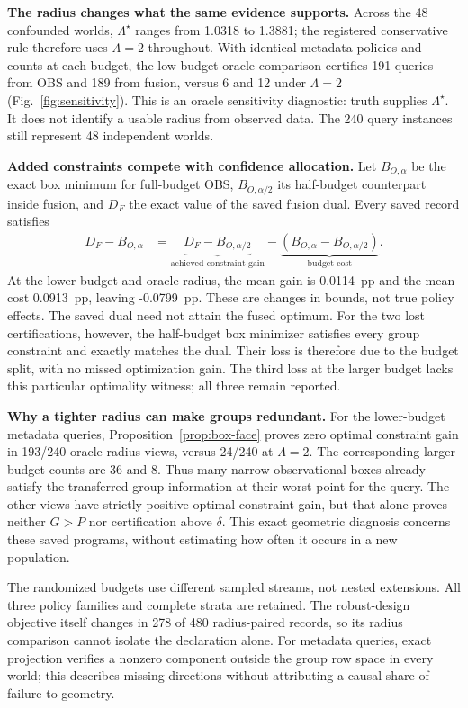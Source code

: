 \textbf{The radius changes what the same evidence supports.}
Across the 48 confounded worlds, $\Lambda^\star$ ranges from 1.0318 to 1.3881; the registered conservative rule therefore uses $\Lambda=2$ throughout. With identical metadata policies and counts at each budget, the low-budget oracle comparison certifies 191 queries from OBS and 189 from fusion, versus 6 and 12 under $\Lambda=2$ (Fig.~\ref{fig:sensitivity}). This is an oracle sensitivity diagnostic: truth supplies $\Lambda^\star$. It does not identify a usable radius from observed data. The 240 query instances still represent 48 independent worlds.

\textbf{Added constraints compete with confidence allocation.}
Let $B_{O,\alpha}$ be the exact box minimum for full-budget OBS, $B_{O,\alpha/2}$ its half-budget counterpart inside fusion, and $D_F$ the exact value of the saved fusion dual. Every saved record satisfies
\begin{align}
 D_F-B_{O,\alpha}
 &=\underbrace{D_F-B_{O,\alpha/2}}_{\text{achieved constraint gain}}
 -\underbrace{(B_{O,\alpha}-B_{O,\alpha/2})}_{\text{budget cost}}.\label{eq:budget-diagnostic}
\end{align}
At the lower budget and oracle radius, the mean gain is 0.0114~pp and the mean cost 0.0913~pp, leaving -0.0799~pp. These are changes in bounds, not true policy effects. The saved dual need not attain the fused optimum. For the two lost certifications, however, the half-budget box minimizer satisfies every group constraint and exactly matches the dual. Their loss is therefore due to the budget split, with no missed optimization gain. The third loss at the larger budget lacks this particular optimality witness; all three remain reported.

\textbf{Why a tighter radius can make groups redundant.}
For the lower-budget metadata queries, Proposition~\ref{prop:box-face} proves zero optimal constraint gain in 193/240 oracle-radius views, versus 24/240 at $\Lambda=2$. The corresponding larger-budget counts are 36 and 8. Thus many narrow observational boxes already satisfy the transferred group information at their worst point for the query. The other views have strictly positive optimal constraint gain, but that alone proves neither $G>P$ nor certification above $\delta$. This exact geometric diagnosis concerns these saved programs, without estimating how often it occurs in a new population.

The randomized budgets use different sampled streams, not nested extensions. All three policy families and complete strata are retained. The robust-design objective itself changes in 278 of 480 radius-paired records, so its radius comparison cannot isolate the declaration alone. For metadata queries, exact projection verifies a nonzero component outside the group row space in every world; this describes missing directions without attributing a causal share of failure to geometry.

